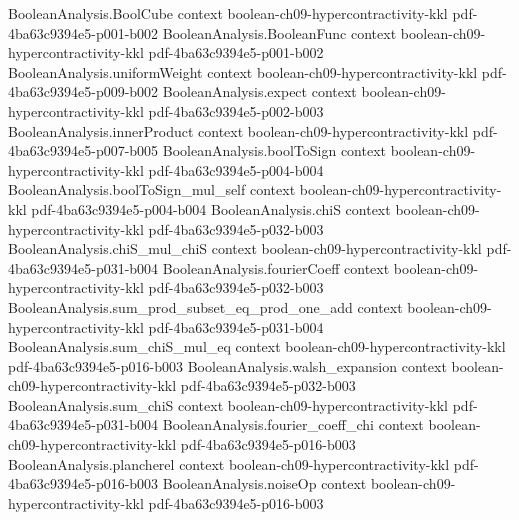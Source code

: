 \begin{lemma}
\label{BooleanAnalysis.Hypercontractivity.noise_op_norm_dual}
\leanok
{}
\proofstep
  {BooleanAnalysis.BoolCube}
  {context}
  {boolean-ch09-hypercontractivity-kkl}
  {pdf-4ba63c9394e5-p001-b002}
\proofstep
  {BooleanAnalysis.BooleanFunc}
  {context}
  {boolean-ch09-hypercontractivity-kkl}
  {pdf-4ba63c9394e5-p001-b002}
\proofstep
  {BooleanAnalysis.uniformWeight}
  {context}
  {boolean-ch09-hypercontractivity-kkl}
  {pdf-4ba63c9394e5-p009-b002}
\proofstep
  {BooleanAnalysis.expect}
  {context}
  {boolean-ch09-hypercontractivity-kkl}
  {pdf-4ba63c9394e5-p002-b003}
\proofstep
  {BooleanAnalysis.innerProduct}
  {context}
  {boolean-ch09-hypercontractivity-kkl}
  {pdf-4ba63c9394e5-p007-b005}
\proofstep
  {BooleanAnalysis.boolToSign}
  {context}
  {boolean-ch09-hypercontractivity-kkl}
  {pdf-4ba63c9394e5-p004-b004}
\proofstep
  {BooleanAnalysis.boolToSign_mul_self}
  {context}
  {boolean-ch09-hypercontractivity-kkl}
  {pdf-4ba63c9394e5-p004-b004}
\proofstep
  {BooleanAnalysis.chiS}
  {context}
  {boolean-ch09-hypercontractivity-kkl}
  {pdf-4ba63c9394e5-p032-b003}
\proofstep
  {BooleanAnalysis.chiS_mul_chiS}
  {context}
  {boolean-ch09-hypercontractivity-kkl}
  {pdf-4ba63c9394e5-p031-b004}
\proofstep
  {BooleanAnalysis.fourierCoeff}
  {context}
  {boolean-ch09-hypercontractivity-kkl}
  {pdf-4ba63c9394e5-p032-b003}
\proofstep
  {BooleanAnalysis.sum_prod_subset_eq_prod_one_add}
  {context}
  {boolean-ch09-hypercontractivity-kkl}
  {pdf-4ba63c9394e5-p031-b004}
\proofstep
  {BooleanAnalysis.sum_chiS_mul_eq}
  {context}
  {boolean-ch09-hypercontractivity-kkl}
  {pdf-4ba63c9394e5-p016-b003}
\proofstep
  {BooleanAnalysis.walsh_expansion}
  {context}
  {boolean-ch09-hypercontractivity-kkl}
  {pdf-4ba63c9394e5-p032-b003}
\proofstep
  {BooleanAnalysis.sum_chiS}
  {context}
  {boolean-ch09-hypercontractivity-kkl}
  {pdf-4ba63c9394e5-p031-b004}
\proofstep
  {BooleanAnalysis.fourier_coeff_chi}
  {context}
  {boolean-ch09-hypercontractivity-kkl}
  {pdf-4ba63c9394e5-p016-b003}
\proofstep
  {BooleanAnalysis.plancherel}
  {context}
  {boolean-ch09-hypercontractivity-kkl}
  {pdf-4ba63c9394e5-p016-b003}
\proofstep
  {BooleanAnalysis.noiseOp}
  {context}
  {boolean-ch09-hypercontractivity-kkl}
  {pdf-4ba63c9394e5-p016-b003}

\end{lemma}
